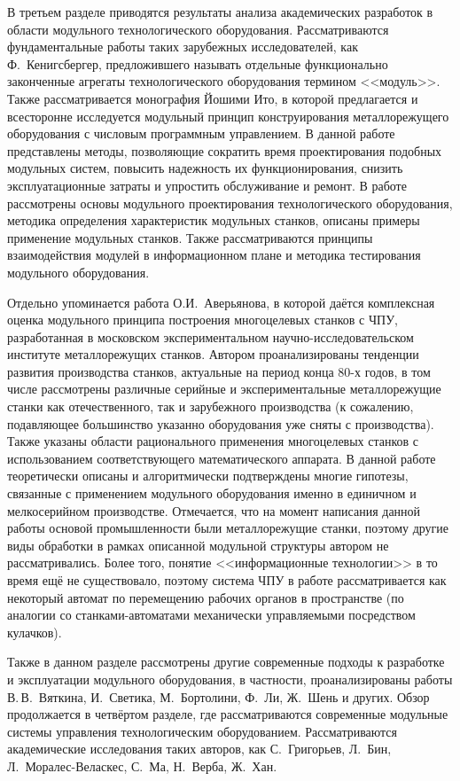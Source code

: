 В третьем разделе приводятся результаты анализа академических разработок в области модульного технологического оборудования. Рассматриваются фундаментальные работы таких зарубежных исследователей, как Ф.~Кенигсбергер, предложившего называть отдельные функционально законченные агрегаты технологического оборудования термином <<модуль>>. Также рассматривается монография Йошими Ито, в которой предлагается и всесторонне исследуется модульный принцип конструирования металлорежущего оборудования с числовым программным управлением. В данной работе представлены методы, позволяющие сократить время проектирования подобных модульных систем, повысить надежность их функционирования, снизить эксплуатационные затраты и упростить обслуживание и ремонт. В работе рассмотрены основы модульного проектирования технологического оборудования, методика определения характеристик модульных станков, описаны примеры применение модульных станков. Также рассматриваются принципы взаимодействия модулей в информационном плане и методика тестирования модульного оборудования.

Отдельно упоминается работа О.И.~Аверьянова, в которой даётся комплексная оценка модульного принципа построения многоцелевых станков с ЧПУ, разработанная в московском экспериментальном научно-исследовательском институте металлорежущих станков. Автором проанализированы тенденции развития производства станков, актуальные на период конца 80-х годов, в том числе рассмотрены различные серийные и экспериментальные металлорежущие станки как отечественного, так и зарубежного производства (к сожалению, подавляющее большинство указанно оборудования уже сняты с производства). Также указаны области рационального применения многоцелевых станков с использованием соответствующего математического аппарата. В данной работе теоретически описаны и алгоритмически подтверждены многие гипотезы, связанные с применением модульного оборудования именно в единичном и мелкосерийном производстве. Отмечается, что на момент написания данной работы основой промышленности были металлорежущие станки, поэтому другие виды обработки в рамках описанной модульной структуры автором не рассматривались. Более того, понятие <<информационные технологии>> в то время ещё не существовало, поэтому система ЧПУ в работе рассматривается как некоторый автомат по перемещению рабочих органов в пространстве (по аналогии со станками-автоматами механически управляемыми посредством кулачков).

Также в данном разделе рассмотрены другие современные подходы к разработке и эксплуатации модульного оборудования, в частности, проанализированы работы В.\,В.~Вяткина, И.~Светика, М.~Бортолини, Ф.~Ли, Ж.~Шень и других. Обзор продолжается в четвёртом разделе, где рассматриваются современные модульные системы управления технологическим оборудованием. Рассматриваются академические исследования таких авторов, как С.~Григорьев, Л.~Бин, Л.~Моралес-Веласкес, С.~Ма, Н.~Верба, Ж.~Хан.

